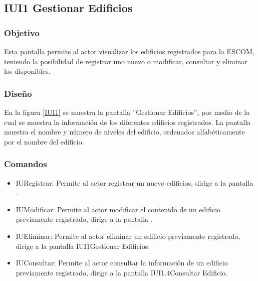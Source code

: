 \subsection{IUI1 Gestionar Edificios}

\subsubsection{Objetivo}
	
	Esta pantalla permite al actor visualizar los edificios registrados para la ESCOM, teniendo la posibilidad de registrar uno nuevo o modificar, consultar y eliminar los disponibles.

\subsubsection{Diseño}

    En la figura \ref{IUI1} se muestra la pantalla ''Gestionar Edificios'', por medio de la cual se muestra la información de los diferentes edificios registrados. La pantalla muestra el nombre y número de niveles del edificio, ordenados alfabéticamente por el nombre del edificio.
 

\subsubsection{Comandos}
    \begin{itemize}
	\item IURegistrar: Permite al actor registrar un nuevo edificios, dirige a la pantalla .
	
	\item IUModificar: Permite al actor modificar el contenido de un edificio previamente registrado, dirige a la pantalla .
	
	\item IUEliminar: Permite al actor eliminar un edificio previamente registrado, dirige a la pantalla {IUI1}{Gestionar Edificios}.
	
	\item IUConsultar: Permite al actor consultar la información de un edificio previamente registrado, dirige a la pantalla {IUI1.4}{Consultar Edificio}.
    \end{itemize}
